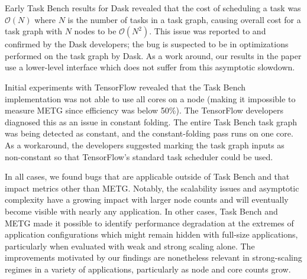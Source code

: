 Early Task Bench results for Dask revealed that the cost of scheduling
a task was $\mathcal{O}(N)$ where $N$ is the number of tasks in a task
graph, causing overall cost for a task graph with $N$ nodes to be
$\mathcal{O}(N^2)$. This issue was reported to and confirmed by the
Dask developers; the bug is suspected to be in optimizations performed
on the task graph by Dask. As a work around, our results in the paper use a
lower-level interface which does not suffer from this asymptotic
slowdown.

Initial experiments with TensorFlow revealed that the Task
Bench implementation was not able to use all cores on a node (making it impossible to measure METG since efficiency was below
50\%). The TensorFlow developers diagnosed this as an issue in
constant folding. The entire Task Bench task graph was being detected
as constant, and the constant-folding pass runs on one core. As a
workaround, the developers suggested marking the task graph inputs as
non-constant so that TensorFlow's standard task scheduler could be
used.

In all cases, we found bugs that are applicable outside of Task Bench
and that impact metrics other than METG. Notably, the scalability
issues and asymptotic complexity have a growing impact with larger
node counts and will eventually become visible with nearly any
application. In other cases, Task Bench and METG made it possible to
identify performance degradation at the extremes of application
configurations which might remain hidden with full-size applications,
particularly when evaluated with weak and strong scaling alone. The
improvements motivated by our findings are nonetheless relevant in
strong-scaling regimes in a variety of applications, particularly as
node and core counts grow.

